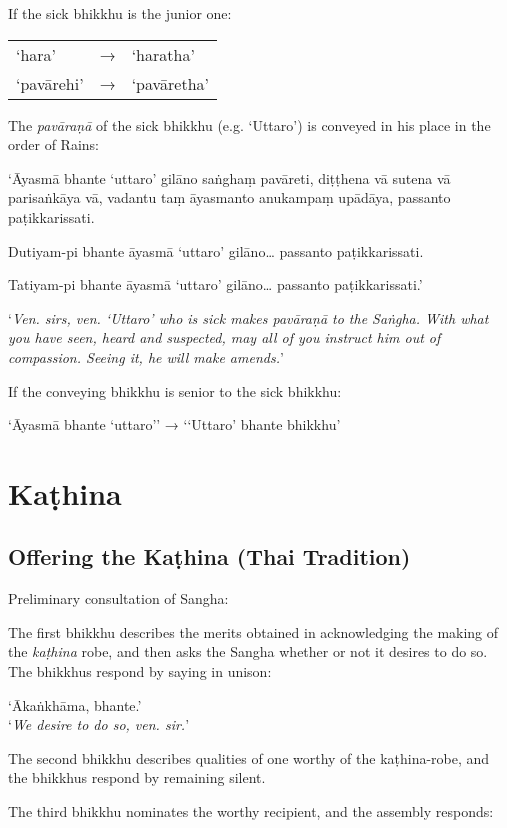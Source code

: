 
If the sick bhikkhu is the junior one:

\begin{tabular}{@{}lll@{}}
‘hara’ & → & ‘haratha’\\
‘pavārehi’ & → & ‘pavāretha’\\
\end{tabular}

The \emph{pavāraṇā} of the sick bhikkhu (e.g. ‘Uttaro’) is conveyed in his place
in the order of Rains:

‘Āyasmā bhante ‘uttaro’ gilāno saṅghaṃ pavāreti, diṭṭhena vā sutena vā
parisaṅkāya vā, vadantu taṃ āyasmanto anukampaṃ upādāya, passanto
paṭikkarissati.

Dutiyam-pi bhante āyasmā ‘uttaro’ gilāno… passanto paṭikkarissati.

Tatiyam-pi bhante āyasmā ‘uttaro’ gilāno… passanto paṭikkarissati.’

‘\emph{Ven. sirs, ven. ‘Uttaro’ who is sick makes pavāraṇā to the Saṅgha. With
  what you have seen, heard and suspected, may all of you instruct him out of
  compassion. Seeing it, he will make amends.}’

If the conveying bhikkhu is senior to the sick bhikkhu:

‘Āyasmā bhante ‘uttaro’’ → ‘‘Uttaro’ bhante bhikkhu’


\section{Kaṭhina}

\subsection{Offering the Kaṭhina (Thai Tradition)}

Preliminary consultation of Sangha:

The first bhikkhu describes the merits obtained in acknowledging the making of
the \emph{kaṭhina} robe, and then asks the Sangha whether or not it desires to
do so. The bhikkhus respond by saying in unison:

‘Ākaṅkhāma, bhante.’\\
‘\emph{We desire to do so, ven. sir.}’

The second bhikkhu describes qualities of one worthy of the kaṭhina-robe, and
the bhikkhus respond by remaining silent.

The third bhikkhu nominates the worthy recipient, and the assembly responds:

